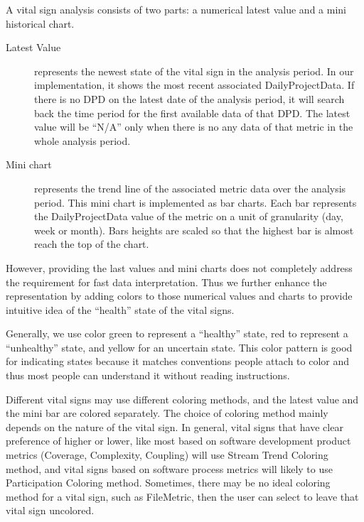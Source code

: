A vital sign analysis consists of two parts: a numerical latest value and a mini historical chart. 
\begin{description}
\item[Latest Value] represents the newest state of the vital sign in the analysis period. In our implementation, it shows the most recent associated DailyProjectData. If there is no DPD on the latest date of the analysis period, it will search back the time period for the first available data of that DPD. The latest value will be ``N/A'' only when there is no any data of that metric in the whole analysis period.
\item[Mini chart] represents the trend line of the associated metric data over the analysis period. This mini chart is implemented as bar charts. Each bar represents the DailyProjectData value of the metric on a unit of granularity (day, week or month). Bars heights are scaled so that the highest bar is almost reach the top of the chart.
\end{description}

However, providing the last values and mini charts does not completely address the requirement for fast data interpretation. Thus we further enhance the representation by adding colors to those numerical values and charts to provide intuitive idea of the ``health'' state of the vital signs.

Generally, we use color green to represent a ``healthy'' state, red to represent a ``unhealthy'' state, and yellow for an uncertain state. This color pattern is good for indicating states because it matches conventions people attach to color and thus most people can understand it without reading instructions.

Different vital signs may use different coloring methods, and the latest value and the mini bar are colored separately. The choice of coloring method mainly depends on the nature of the vital sign. In general, vital signs that have clear preference of higher or lower, like most based on software development product metrics (Coverage, Complexity, Coupling) will use Stream Trend Coloring method, and vital signs based on software process metrics will likely to use Participation Coloring method. Sometimes, there may be no ideal coloring method for a vital sign, such as FileMetric, then the user can select to leave that vital sign uncolored.

